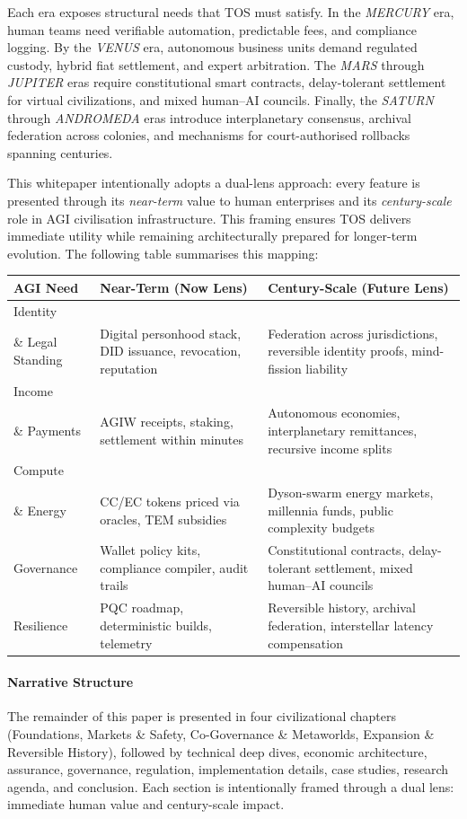 \documentclass[11pt]{article}
\begin{document}
Each era exposes structural needs that TOS must satisfy. In the \emph{MERCURY} era, human teams need verifiable automation, predictable fees, and compliance logging. By the \emph{VENUS} era, autonomous business units demand regulated custody, hybrid fiat settlement, and expert arbitration. The \emph{MARS} through \emph{JUPITER} eras require constitutional smart contracts, delay-tolerant settlement for virtual civilizations, and mixed human--AI councils. Finally, the \emph{SATURN} through \emph{ANDROMEDA} eras introduce interplanetary consensus, archival federation across colonies, and mechanisms for court-authorised rollbacks spanning centuries.

This whitepaper intentionally adopts a dual-lens approach: every feature is presented through its \emph{near-term} value to human enterprises and its \emph{century-scale} role in AGI civilisation infrastructure. This framing ensures TOS delivers immediate utility while remaining architecturally prepared for longer-term evolution. The following table summarises this mapping:

\begin{longtable}{@{}p{}p{}p{}@{}}
\toprule
\textbf{AGI Need} & \textbf{Near-Term (Now Lens)} & \textbf{Century-Scale (Future Lens)} \\\midrule
Identity \\ \& Legal Standing & Digital personhood stack, DID issuance, revocation, reputation & Federation across jurisdictions, reversible identity proofs, mind-fission liability \\
Income \\ \& Payments & AGIW receipts, staking, settlement within minutes & Autonomous economies, interplanetary remittances, recursive income splits \\
Compute \\ \& Energy & CC/EC tokens priced via oracles, TEM subsidies & Dyson-swarm energy markets, millennia funds, public complexity budgets \\
Governance & Wallet policy kits, compliance compiler, audit trails & Constitutional contracts, delay-tolerant settlement, mixed human--AI councils \\
Resilience & PQC roadmap, deterministic builds, telemetry & Reversible history, archival federation, interstellar latency compensation \\\bottomrule
\end{longtable}

\paragraph{Narrative Structure} The remainder of this paper is presented in four civilizational chapters (Foundations, Markets \& Safety, Co-Governance \& Metaworlds, Expansion \& Reversible History), followed by technical deep dives, economic architecture, assurance, governance, regulation, implementation details, case studies, research agenda, and conclusion. Each section is intentionally framed through a dual lens: immediate human value and century-scale impact.
\end{document}

